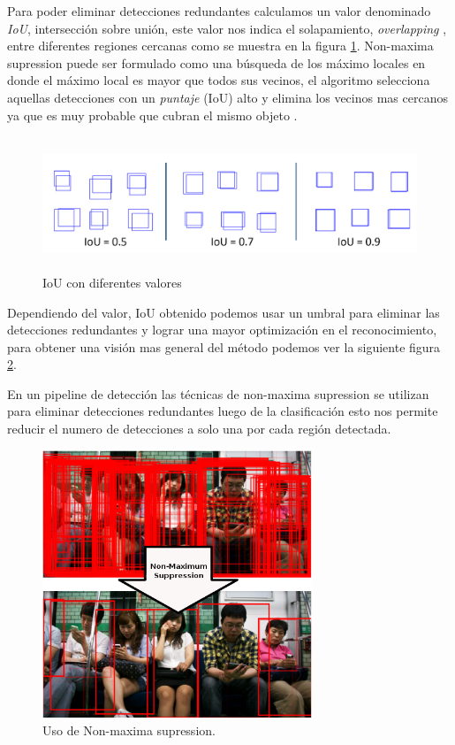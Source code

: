 Para poder eliminar detecciones redundantes calculamos un valor denominado  \textit{IoU}, intersección sobre unión,  este valor nos indica el solapamiento, \textit{overlapping} ,  entre diferentes regiones cercanas como se muestra en la figura \ref{Fig: interseccion}. Non-maxima supression puede ser formulado como una búsqueda de los máximo locales en donde el máximo local es  mayor que todos sus vecinos,  el algoritmo selecciona aquellas detecciones con un \textit{puntaje} (IoU) alto y elimina los vecinos mas cercanos ya que es muy probable que cubran el mismo objeto \citep{nms2}.

\begin{figure}[H]
 \centering
  \includegraphics[height=4cm,keepaspectratio=true,clip=true]{imagenes/MarcoTeorico/overlapping.png}
  \caption{IoU con diferentes valores}\label{Fig: interseccion}
\end{figure}

Dependiendo del valor, IoU  obtenido podemos usar un umbral para  eliminar las detecciones redundantes y lograr una mayor optimización  en el reconocimiento, para obtener una visión mas general del método podemos ver la siguiente figura \ref{Fig: nonmaximumsuppression}. 

En un pipeline de detección las técnicas de non-maxima supression se utilizan para eliminar detecciones redundantes luego de la clasificación esto nos permite reducir el numero de detecciones a solo una por cada región detectada.

\begin{figure}[H]
 \centering
  \includegraphics[height=8cm,keepaspectratio=true,clip=true]{imagenes/MarcoTeorico/nms.png}
  \caption{Uso de Non-maxima supression.}\label{Fig: nonmaximumsuppression}
\end{figure}

